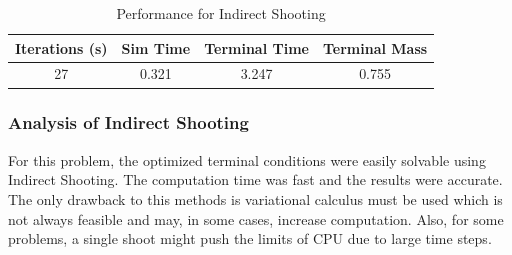 \documentclass[]{article}
\begin{document}
\FloatBarrier
\begin{table}
	\centering
	\begin{tabular}{||c c c c||} 
		\hline
		Iterations (s) & Sim Time & Terminal Time & Terminal Mass\\ [0.5ex] 
		\hline\hline
		27            & 0.321     &   3.247       & 0.755\\ [1ex]
		\hline
	\end{tabular}
\caption{Performance for Indirect Shooting}
\label{table:1}
\end{table}
\FloatBarrier
\subsubsection{Analysis of Indirect Shooting}
For this problem, the optimized terminal conditions were easily solvable using Indirect Shooting. The computation time was fast and the results were accurate. The only drawback to this methods is variational calculus must be used which is not always feasible and may, in some cases, increase computation. Also, for some problems, a single shoot might push the limits of CPU due to large time steps. 
\end{document}
